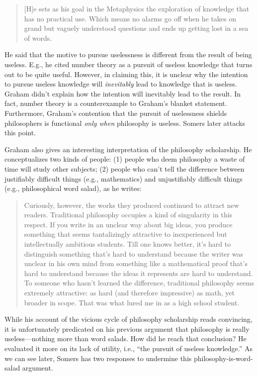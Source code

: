\documentclass[12pt]{article}
\begin{document}
\begin{quotation}
 [H]e sets as his goal in the Metaphysics the exploration of knowledge that has no practical use. Which means no alarms go off when he takes on grand but vaguely understood questions and ends up getting lost in a sea of words.
\end{quotation}

He said that the motive to pursue uselessness is different from the result of being useless. E.g., he cited number theory as a pursuit of useless knowledge that turns out to be quite useful. However, in claiming this, it is unclear why the intention to pursue useless knowledge will \emph{inevitably} lead to knowledge that is useless. Graham didn't explain how the intention will inevitably lead to the result. In fact, number theory is a counterexample to Graham's blanket statement. Furthermore, Graham's contention that the pursuit of uselessness shields philosophers is functional \emph{only when} philosophy is useless. Somers later attacks this point.

Graham also gives an interesting interpretation of the philosophy scholarship. He conceptualizes two kinds of people: (1) people who deem philosophy a waste of time will study other subjects; (2) people who can't tell the difference between justifiably difficult things (e.g., mathematics) and unjustifiably difficult things (e.g., philosophical word salad), as he writes:

\begin{quotation}
 Curiously, however, the works they produced continued to attract new readers. Traditional philosophy occupies a kind of singularity in this respect. If you write in an unclear way about big ideas, you produce something that seems tantalizingly attractive to inexperienced but intellectually ambitious students. Till one knows better, it's hard to distinguish something that's hard to understand because the writer was unclear in his own mind from something like a mathematical proof that's hard to understand because the ideas it represents are hard to understand. To someone who hasn't learned the difference, traditional philosophy seems extremely attractive: as hard (and therefore impressive) as math, yet broader in scope. That was what lured me in as a high school student.
\end{quotation}

While his account of the vicious cycle of philosophy scholarship reads convincing, it is unfortunately predicated on his previous argument that philosophy is really useless---nothing more than word salads. How did he reach that conclusion? He evaluated it more on its lack of utility, i.e., \enquote{the pursuit of useless knowledge.} As we can see later, Somers has two responses to undermine this philosophy-is-word-salad argument.
\end{document}

